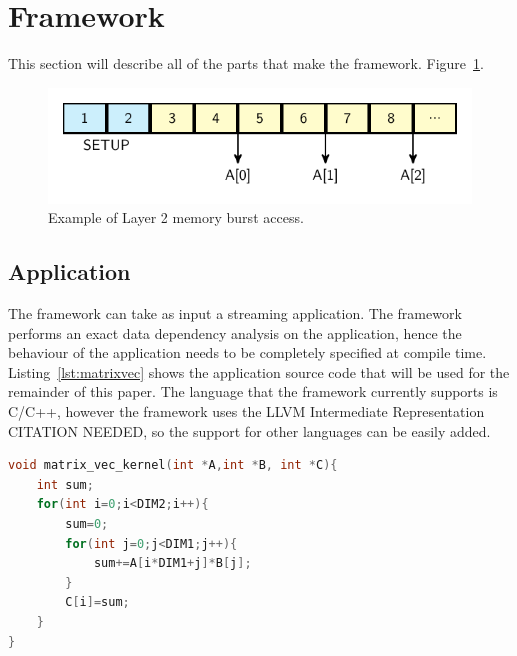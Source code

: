 \section{Framework}
This section will describe all of the parts that make the framework. Figure~\ref{fig:framework}.

\begin{figure}[tb] 
\centering
\includegraphics[width=\columnwidth]{images/l2_model.pdf}
\caption{\small Example of Layer 2 memory burst access.}
\label{fig:framework}
\end{figure}

\subsection{Application}
The framework can take as input a streaming application. The framework performs an exact data dependency analysis on the application, hence the behaviour of the application needs to be completely specified at compile time. Listing~\ref{lst:matrixvec} shows the application source code that will be used for the remainder of this paper. The language that the framework currently supports is C/C++, however the framework uses the LLVM Intermediate Representation CITATION NEEDED, so the support for other languages can be easily added.
\begin{lstlisting}[language=C, caption={Example of input application, C implementation of a matrix vector multiplication.}, label={lst:matrixvec}]
void matrix_vec_kernel(int *A,int *B, int *C){
    int sum;
    for(int i=0;i<DIM2;i++){
        sum=0;
        for(int j=0;j<DIM1;j++){
            sum+=A[i*DIM1+j]*B[j];
        }
        C[i]=sum;
    }
}
\end{lstlisting}

